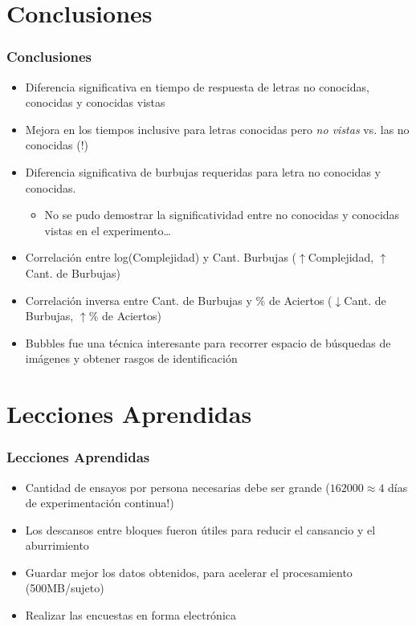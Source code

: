 \documentclass[10pt]{beamer}
\begin{document}
  \section{Conclusiones}
	\begin{frame}
	\frametitle{Conclusiones}
	    \begin{itemize}
		\item Diferencia significativa en tiempo de respuesta de letras no conocidas, conocidas y conocidas vistas
		\item Mejora en los tiempos inclusive para letras conocidas pero \emph{no vistas} vs. las no conocidas \alert{(!)}
		\item Diferencia significativa de burbujas requeridas para letra no conocidas y conocidas.
		\begin{itemize}
		    \item No se pudo demostrar la significatividad entre no conocidas y conocidas vistas en el experimento\ldots
		\end{itemize}
		\item Correlación entre log(Complejidad) y Cant. Burbujas (\alert{\bf$\uparrow$}Complejidad, \alert{\bf$\uparrow$}Cant. de Burbujas)
		\item Correlación inversa entre Cant. de Burbujas y \% de Aciertos (\alert{\bf$\downarrow$}Cant. de Burbujas, \alert{\bf$\uparrow$}\% de Aciertos)
		\item Bubbles fue una técnica interesante para recorrer espacio de búsquedas de imágenes y obtener rasgos de identificación
	    \end{itemize}
	\end{frame}

  \section{Lecciones Aprendidas}
	\begin{frame}
	\frametitle{Lecciones Aprendidas}
	    \begin{itemize}
	    \item Cantidad de ensayos por persona necesarias debe ser grande ($162000 \approx 4$ días de experimentación continua\alert{!})
	    \item Los descansos entre bloques fueron útiles para reducir el cansancio y el aburrimiento
	    \item Guardar mejor los datos obtenidos, para acelerar el procesamiento (500MB/sujeto)
	    \item Realizar las encuestas en forma electrónica
	    \end{itemize}
	\end{frame}
\end{document}
